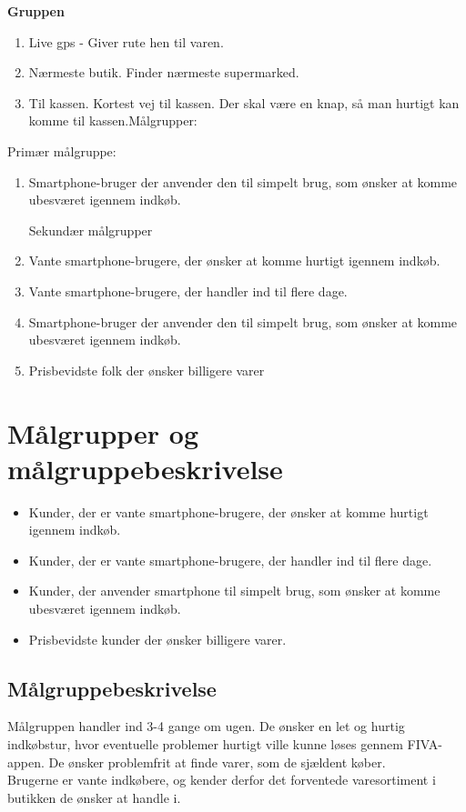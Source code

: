 \documentclass[12pt]{article}
\begin{document}
\textbf{Gruppen}\\
\begin{enumerate}
\item Live gps - Giver rute hen til varen.
\item Nærmeste butik. Finder nærmeste supermarked.
\item Til kassen. Kortest vej til kassen. Der skal være en knap, så man hurtigt kan komme til kassen.Målgrupper:
\end{enumerate}
Primær målgruppe:
\begin{enumerate}
\item Smartphone-bruger der anvender den til simpelt brug, som ønsker at komme ubesværet igennem indkøb.

Sekund\ae r m\aa lgrupper
\item Vante smartphone-brugere, der ønsker at komme hurtigt igennem indkøb.
\item Vante smartphone-brugere, der handler ind til flere dage.
\item Smartphone-bruger der anvender den til simpelt brug, som ønsker at komme ubesværet igennem indkøb.
\item Prisbevidste folk der ønsker billigere varer
\end{enumerate}

\section{M\aa lgrupper og m\aa lgruppebeskrivelse}
\begin{itemize}
\item Kunder, der er vante smartphone-brugere, der ønsker at komme hurtigt igennem indkøb.
\item Kunder, der er vante smartphone-brugere, der handler ind til flere dage.
\item Kunder, der anvender smartphone til simpelt brug, som ønsker at komme ubesværet igennem indkøb.
\item Prisbevidste kunder der ønsker billigere varer.
\end{itemize}

\subsection{Målgruppebeskrivelse}
Målgruppen handler ind 3-4 gange om ugen. De ønsker en let og hurtig indkøbstur, hvor eventuelle problemer hurtigt ville kunne løses gennem FIVA-appen. De ønsker problemfrit at finde varer, som de sjældent køber.\\
Brugerne er vante indkøbere, og kender derfor det forventede varesortiment i butikken de ønsker at handle i.\\
\end{document}

